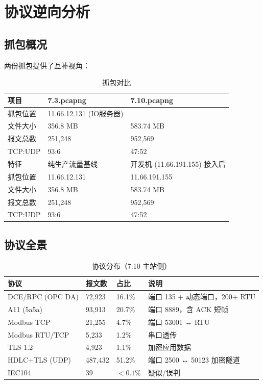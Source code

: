 \documentclass[12pt,a4paper]{ctexart}
\begin{document}
\section{协议逆向分析}

\subsection{抓包概况}

两份抓包提供了互补视角：

\begin{table}[H]\centering
\caption{抓包对比}
\begin{tabular}{p{3cm} p{4cm} p{4cm}}
\toprule
\textbf{项目} & \textbf{7.3.pcapng} & \textbf{7.10.pcapng} \\
\midrule
抓包位置 & 11.66.12.131 (IO服务器) \\
文件大小 & 356.8 MB & 583.74 MB \\
报文总数 & 251,248 & 952,569 \\
TCP:UDP & 93:6 & 47:52 \\
特征 & 纯生产流量基线 & 开发机 (11.66.191.155) 接入后 \\
\midrule
抓包位置 & 11.66.12.131 & 11.66.191.155 \\
文件大小 & 356.8 MB & 583.74 MB \\
报文总数 & 251,248 & 952,569 \\
TCP:UDP & 93:6 & 47:52 \\
\bottomrule
\end{tabular}
\end{table}

\subsection{协议全景}

\begin{table}[H]\centering
\caption{协议分布（7.10 主站侧）}
\begin{tabular}{p{3.5cm} p{2cm} p{2cm} p{5cm}}
\toprule
\textbf{协议} & \textbf{报文数} & \textbf{占比} & \textbf{说明} \\
\midrule
DCE/RPC (OPC DA) & 72,923 & 16.1\% & 端口 135 + 动态端口，200+ RTU \\
A11 (5a5a) & 93,913 & 20.7\% & 端口 8889，含 ACK 短帧 \\
Modbus TCP & 21,255 & 4.7\% & 端口 53001 ↔ RTU \\
Modbus RTU/TCP & 5,233 & 1.2\% & 串口透传 \\
TLS 1.2 & 4,923 & 1.1\% & 加密应用数据 \\
HDLC+TLS (UDP) & 487,432 & 51.2\% & 端口 2500 ↔ 50123 加密隧道 \\
IEC104 & 39 & $<0.1\%$ & 疑似/误判 \\
\bottomrule
\end{tabular}
\end{table}
\end{document}
